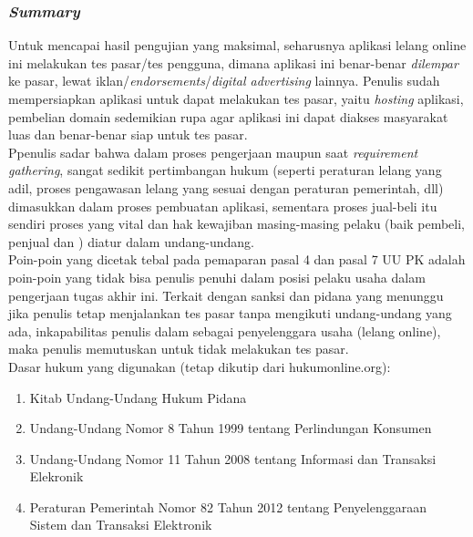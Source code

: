 \subsubsection{\textit{Summary}}
	\indent Untuk mencapai hasil pengujian yang maksimal, seharusnya aplikasi lelang online ini melakukan tes pasar/tes pengguna, dimana aplikasi ini benar-benar \textit{dilempar} ke pasar, lewat iklan/\textit{endorsements}/\textit{digital advertising} lainnya. Penulis sudah mempersiapkan aplikasi untuk dapat melakukan tes pasar, yaitu \textit{hosting} aplikasi, pembelian domain sedemikian rupa agar aplikasi ini dapat diakses masyarakat luas dan benar-benar siap untuk tes pasar.\\
	\indent Ppenulis sadar bahwa dalam proses pengerjaan maupun saat \textit{requirement gathering}, sangat sedikit pertimbangan hukum (seperti peraturan lelang yang adil, proses pengawasan lelang yang sesuai dengan peraturan pemerintah, dll) dimasukkan dalam proses pembuatan aplikasi, sementara proses jual-beli itu sendiri proses yang vital dan hak kewajiban masing-masing pelaku (baik pembeli, penjual dan ) diatur dalam undang-undang. \\ 
	\indent Poin-poin yang dicetak tebal pada pemaparan pasal 4 dan pasal 7 UU PK adalah poin-poin yang tidak bisa penulis penuhi dalam posisi pelaku usaha dalam pengerjaan tugas akhir ini. Terkait dengan sanksi dan pidana yang menunggu jika penulis tetap menjalankan tes pasar tanpa mengikuti undang-undang yang ada, inkapabilitas penulis dalam sebagai penyelenggara usaha (lelang online), maka penulis memutuskan untuk tidak melakukan tes pasar.
	\\

	Dasar hukum yang digunakan (tetap dikutip dari hukumonline.org):
	\begin{enumerate}
		\item Kitab Undang-Undang Hukum Pidana
		\item Undang-Undang Nomor 8 Tahun 1999 tentang Perlindungan Konsumen
		\item Undang-Undang Nomor 11 Tahun 2008 tentang Informasi dan Transaksi Elekronik
		\item Peraturan Pemerintah Nomor 82 Tahun 2012 tentang Penyelenggaraan Sistem dan Transaksi Elektronik
	\end{enumerate}